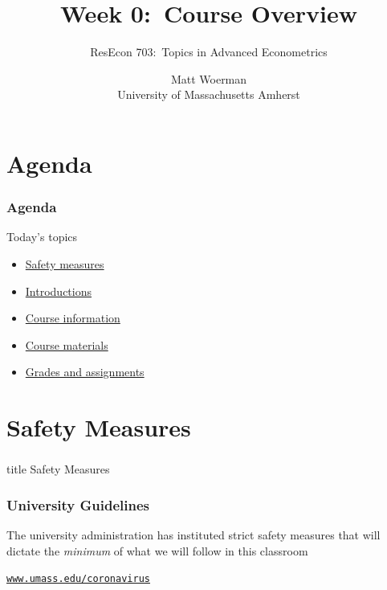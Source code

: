 \documentclass{beamer}
\title[Week 0:\ Course Overview]{Week 0:\ Course Overview}
\author[ResEcon 703:\ Advanced Econometrics]{ResEcon 703:\ Topics in Advanced Econometrics}
\date{Matt Woerman\\University of Massachusetts Amherst}
\begin{document}
{ 
\begin{frame}[noframenumbering]
    \titlepage
\end{frame}
}

\section{Agenda}
\begin{frame}\frametitle{Agenda}
    Today's topics
    \begin{itemize}
        \item \hyperlink{page.\getpagerefnumber{safety}}{Safety measures}
    	\item \hyperlink{page.\getpagerefnumber{introductions}}{Introductions}
        \item \hyperlink{page.\getpagerefnumber{information}}{Course information}
        \item \hyperlink{page.\getpagerefnumber{materials}}{Course materials}
        \item \hyperlink{page.\getpagerefnumber{grades}}{Grades and assignments}
    \end{itemize}
\end{frame}

\section{Safety Measures}
\label{safety}
\begin{frame}\frametitle{}
    \vfill
    \centering
    \begin{beamercolorbox}[center]{title}
        \Large Safety Measures
    \end{beamercolorbox}
    \vfill
\end{frame}

\begin{frame}\frametitle{University Guidelines}
    The university administration has instituted strict safety measures that will dictate the \emph{minimum} of what we will follow in this classroom
    \vspace{3ex}
    \begin{center}
        \href{https://www.umass.edu/coronavirus/}{\texttt{www.umass.edu/coronavirus}}
    \end{center}
\end{frame}
\end{document}
